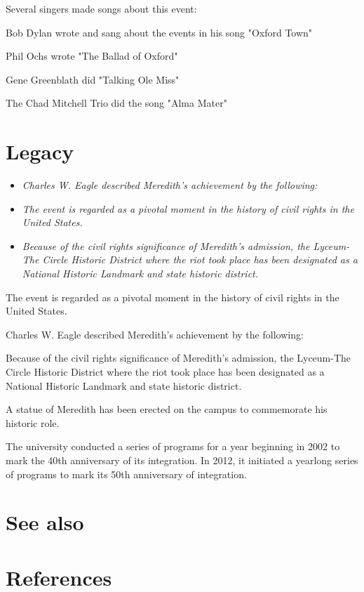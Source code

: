 Several singers made songs about this event:

Bob Dylan wrote and sang about the events in his song "Oxford Town"

Phil Ochs wrote "The Ballad of Oxford"

Gene Greenblath did "Talking Ole Miss"

The Chad Mitchell Trio did the song "Alma Mater"

\section{Legacy}\label{legacy}

\begin{itemize}
\item
  \emph{Charles W. Eagle described Meredith's achievement by the
  following:}
\item
  \emph{The event is regarded as a pivotal moment in the history of
  civil rights in the United States.}
\item
  \emph{Because of the civil rights significance of Meredith's
  admission, the Lyceum-The Circle Historic District where the riot took
  place has been designated as a National Historic Landmark and state
  historic district.}
\end{itemize}

The event is regarded as a pivotal moment in the history of civil rights
in the United States.

Charles W. Eagle described Meredith's achievement by the following:

Because of the civil rights significance of Meredith's admission, the
Lyceum-The Circle Historic District where the riot took place has been
designated as a National Historic Landmark and state historic district.

A statue of Meredith has been erected on the campus to commemorate his
historic role.

The university conducted a series of programs for a year beginning in
2002 to mark the 40th anniversary of its integration. In 2012, it
initiated a yearlong series of programs to mark its 50th anniversary of
integration.

\section{See also}\label{see-also}

\section{References}\label{references}

